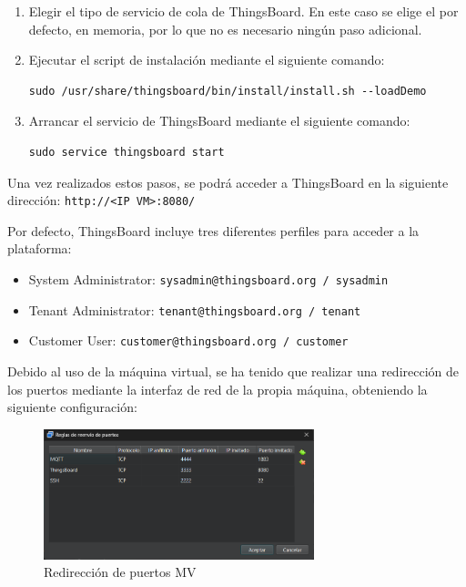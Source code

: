\begin{enumerate}
    \item Elegir el tipo de servicio de cola de ThingsBoard. En este caso se elige el por defecto, en memoria, por lo que no es necesario ningún paso adicional.

    \item Ejecutar el script de instalación mediante el siguiente comando:
    \begin{verbatim}
sudo /usr/share/thingsboard/bin/install/install.sh --loadDemo
    \end{verbatim}

    \item Arrancar el servicio de ThingsBoard mediante el siguiente comando:
    \begin{verbatim}
sudo service thingsboard start
    \end{verbatim}
\end{enumerate}

Una vez realizados estos pasos, se podrá acceder a ThingsBoard en la siguiente dirección: \texttt{http://<IP VM>:8080/}

Por defecto, ThingsBoard incluye tres diferentes perfiles para acceder a la plataforma:
\begin{itemize}
    \item System Administrator: \texttt{sysadmin@thingsboard.org / sysadmin}
    \item Tenant Administrator: \texttt{tenant@thingsboard.org / tenant}
    \item Customer User: \texttt{customer@thingsboard.org / customer}
\end{itemize}

Debido al uso de la máquina virtual, se ha tenido que realizar una redirección de los puertos mediante la interfaz de red de la propia máquina, obteniendo la siguiente configuración:

\begin{figure}[H]
    \centering
    \includegraphics[width=0.7\textwidth]{images/3-software/3-2-2-thingsboard/PuertosMV.png}
    \caption{Redirección de puertos MV}
    \label{fig:3-2-2-PuertosMV}
\end{figure}

